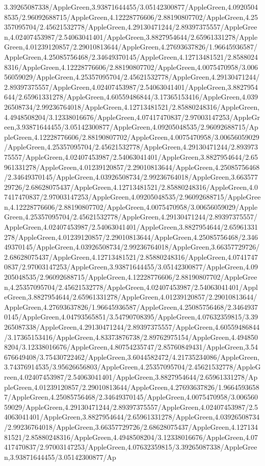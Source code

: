 {\begin{tikzternal}
3.39265087338/AppleGreen,3.93871644455/3.05142300877/AppleGreen,4.09205048535/2.96092688715/AppleGreen,4.12228776606/2.88190807702/AppleGreen,4.25357095704/2.45621532778/AppleGreen,4.29130471244/2.89397375557/AppleGreen,4.02407453987/2.54063041401/AppleGreen,3.8827954644/2.65961331278/AppleGreen,4.01239120857/2.29010813644/AppleGreen,4.27693637826/1.96645936587/AppleGreen,4.25085756468/2.34649370145/AppleGreen,4.12713481521/2.85880248316/AppleGreen,4.12228776606/2.88190807702/AppleGreen,4.0075470958/3.00656059029/AppleGreen,4.25357095704/2.45621532778/AppleGreen,4.29130471244/2.89397375557/AppleGreen,4.02407453987/2.54063041401/AppleGreen,3.8827954644/2.65961331278/AppleGreen,4.60559486844/3.17365153416/AppleGreen,4.03926508734/2.99236764018/AppleGreen,4.12713481521/2.85880248316/AppleGreen,4.4948508204/3.12338016676/AppleGreen,4.07417470837/2.97003147253/AppleGreen,3.93871644455/3.05142300877/AppleGreen,4.09205048535/2.96092688715/AppleGreen,4.12228776606/2.88190807702/AppleGreen,4.0075470958/3.00656059029/AppleGreen,4.25357095704/2.45621532778/AppleGreen,4.29130471244/2.89397375557/AppleGreen,4.02407453987/2.54063041401/AppleGreen,3.8827954644/2.65961331278/AppleGreen,4.01239120857/2.29010813644/AppleGreen,4.25085756468/2.34649370145/AppleGreen,4.03926508734/2.99236764018/AppleGreen,3.66357729726/2.68628075437/AppleGreen,4.12713481521/2.85880248316/AppleGreen,4.07417470837/2.97003147253/AppleGreen,4.09205048535/2.96092688715/AppleGreen,4.12228776606/2.88190807702/AppleGreen,4.0075470958/3.00656059029/AppleGreen,4.25357095704/2.45621532778/AppleGreen,4.29130471244/2.89397375557/AppleGreen,4.02407453987/2.54063041401/AppleGreen,3.8827954644/2.65961331278/AppleGreen,4.01239120857/2.29010813644/AppleGreen,4.25085756468/2.34649370145/AppleGreen,4.03926508734/2.99236764018/AppleGreen,3.66357729726/2.68628075437/AppleGreen,4.12713481521/2.85880248316/AppleGreen,4.07417470837/2.97003147253/AppleGreen,3.93871644455/3.05142300877/AppleGreen,4.09205048535/2.96092688715/AppleGreen,4.12228776606/2.88190807702/AppleGreen,4.25357095704/2.45621532778/AppleGreen,4.02407453987/2.54063041401/AppleGreen,3.8827954644/2.65961331278/AppleGreen,4.01239120857/2.29010813644/AppleGreen,4.27693637826/1.96645936587/AppleGreen,4.25085756468/2.34649370145/AppleGreen,4.04793565851/3.54790708395/AppleGreen,4.07632359815/3.39265087338/AppleGreen,4.29130471244/2.89397375557/AppleGreen,4.60559486844/3.17365153416/AppleGreen,4.83373876738/2.89762975154/AppleGreen,4.4948508204/3.12338016676/AppleGreen,4.80754235747/2.85760849431/AppleGreen,3.54676649408/3.75430722462/AppleGreen,3.6044582472/4.21735234086/AppleGreen,3.74376914535/3.95626656803/AppleGreen,4.25357095704/2.45621532778/AppleGreen,4.02407453987/2.54063041401/AppleGreen,3.8827954644/2.65961331278/AppleGreen,4.01239120857/2.29010813644/AppleGreen,4.27693637826/1.96645936587/AppleGreen,4.25085756468/2.34649370145/AppleGreen,4.0075470958/3.00656059029/AppleGreen,4.29130471244/2.89397375557/AppleGreen,4.02407453987/2.54063041401/AppleGreen,3.8827954644/2.65961331278/AppleGreen,4.03926508734/2.99236764018/AppleGreen,3.66357729726/2.68628075437/AppleGreen,4.12713481521/2.85880248316/AppleGreen,4.4948508204/3.12338016676/AppleGreen,4.07417470837/2.97003147253/AppleGreen,4.07632359815/3.39265087338/AppleGreen,3.93871644455/3.05142300877/Ap
\end{tikzternal}}

